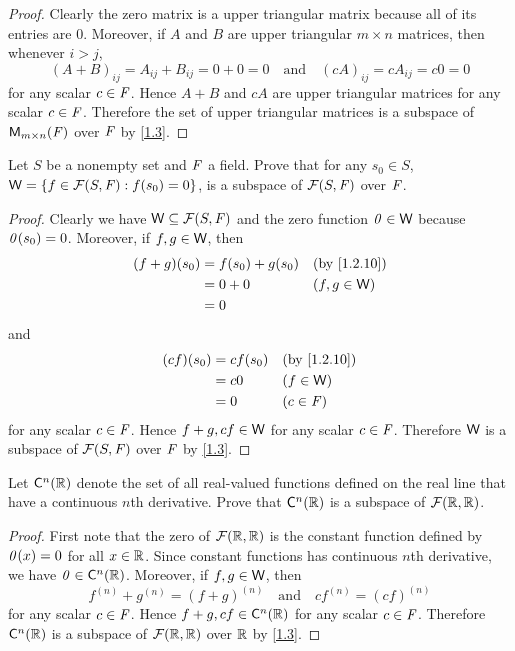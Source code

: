 \begin{proof}
	Clearly the zero matrix is a upper triangular matrix because all of its entries are \(0\).
	Moreover, if \(A\) and \(B\) are upper triangular \(m \times n\) matrices, then whenever \(i > j\),
	\[
		(A + B)_{i j} = A_{i j} + B_{i j} = 0 + 0 = 0 \quad \text{and} \quad (cA)_{i j} = cA_{i j} = c0 = 0
	\]
	for any scalar \(c \in \mathit{F}\).
	Hence \(A + B\) and \(cA\) are upper triangular matrices for any scalar \(c \in \mathit{F}\).
	Therefore the set of upper triangular matrices is a subspace of \(\mathsf{M}_{{m} \times n}({\mathit{F}})\) over \(\mathit{F}\) by \cref{1.3}.
\end{proof}

\begin{ex}\label{ex:1.3.13}
	Let \(S\) be a nonempty set and \(\mathit{F}\) a field.
	Prove that for any \(s_0 \in S\), \(\W = \set{f \in \FS : f(s_0) = 0}\), is a subspace of \(\FS\) over \(\mathit{F}\).
\end{ex}

\begin{proof}
	Clearly we have \(\W \subseteq \FS\) and the zero function \(\mathit{0} \in \mathsf{W}\) because \(\mathit{0}(s_0) = 0\).
	Moreover, if \(f, g \in \mathsf{W}\), then
	\begin{align*}
		(f + g)(s_0) & = f(s_0) + g(s_0) &  & \text{(by \cref{1.2.10})} \\
		             & = 0 + 0           &  & (f, g \in \W)             \\
		             & = 0
	\end{align*}
	and
	\begin{align*}
		(cf)(s_0) & = cf(s_0) &  & \text{(by \cref{1.2.10})} \\
		          & = c0      &  & (f \in \W)                \\
		          & = 0       &  & (c \in \F)
	\end{align*}
	for any scalar \(c \in \mathit{F}\).
	Hence \(f + g, cf \in \mathsf{W}\) for any scalar \(c \in \mathit{F}\).
	Therefore \(\mathsf{W}\) is a subspace of \(\FS\) over \(\mathit{F}\) by \cref{1.3}.
\end{proof}

\setcounter{ex}{15}
\begin{ex}\label{ex:1.3.16}
	Let \(\cfs[n]{\R}\) denote the set of all real-valued functions defined on the real line that have a continuous \(n\)th derivative.
	Prove that \(\cfs[n]{\R}\) is a subspace of \(\fs{\R}{\R}\).
\end{ex}

\begin{proof}
	First note that the zero of \(\fs{\R}{\R}\) is the constant function defined by \(\mathit{0}(x) = 0\) for all \(x \in \mathbb{R}\).
	Since constant functions has continuous \(n\)th derivative, we have \(\zv \in \cfs[n]{\R}\).
	Moreover, if \(f, g \in \mathsf{W}\), then
	\[
		f^{(n)} + g^{(n)} = (f + g)^{(n)} \quad \text{and} \quad cf^{(n)} = (cf)^{(n)}
	\]
	for any scalar \(c \in \mathit{F}\).
	Hence \(f + g, cf \in \cfs[n]{\R}\) for any scalar \(c \in \mathit{F}\).
	Therefore \(\cfs[n]{\R}\) is a subspace of \(\fs{\R}{\R}\) over \(\mathbb{R}\) by \cref{1.3}.
\end{proof}

